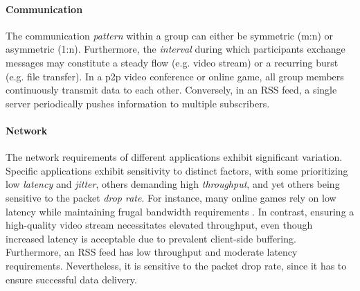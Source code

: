 \paragraph{Communication} %
\label{par:Communication}
The communication \textit{pattern} within a group can either be symmetric
    (m:n) or asymmetric (1:n).
Furthermore, the \textit{interval} during which participants exchange messages
    may constitute a steady flow (e.g. video stream) or a recurring burst (e.g.
    file transfer).
In a \gls{p2p} video conference or online game, all group members continuously
    transmit data to each other.
Conversely, in an RSS feed, a single server periodically pushes information to
    multiple subscribers.

\paragraph{Network} %
\label{par:Network}
The network requirements of different applications exhibit significant
    variation.
Specific applications exhibit sensitivity to distinct factors, with some
    prioritizing low \textit{latency} and \textit{jitter}, others demanding
    high \textit{throughput}, and yet others being sensitive to the packet
    \textit{drop rate}.
For instance, many online games rely on low latency while maintaining frugal
    bandwidth requirements \cite{games_net_req}.
In contrast, ensuring a high-quality video stream necessitates elevated
    throughput, even though increased latency is acceptable due to prevalent
    client-side buffering.
Furthermore, an RSS feed has low throughput and moderate latency requirements.
Nevertheless, it is sensitive to the packet drop rate, since it has to ensure
    successful data delivery.

